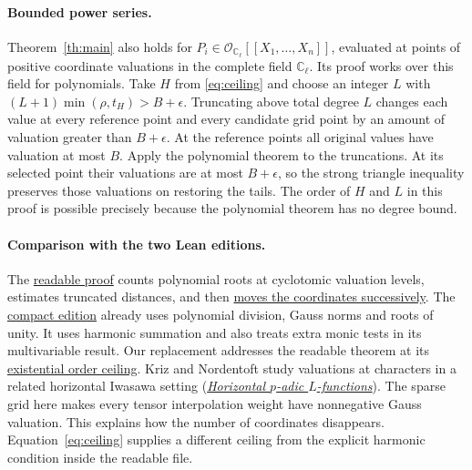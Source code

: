 \documentclass[11pt]{article}
\newcommand{\cO}{\mathcal O}\newcommand{\Tr}{\operatorname{tr}}
\newcommand{\src}[3]{\href{https://github.com/lsernau/grh-lean/blob/72fead102f663d5c7a407964a13dc0cf9d977207/grh/src/#1.lean\#L#2}{#3}}
\newcommand{\cmp}[3]{\href{https://github.com/lsernau/grh-lean/blob/72fead102f663d5c7a407964a13dc0cf9d977207/grh-compact/src/#1.lean\#L#2}{#3}}
\newcommand{\rootsrc}[2]{\src{New/Congruences/Selmer/RootsOfUnity}{#1}{#2}}
\begin{document}
\paragraph{Bounded power series.} Theorem~\ref{th:main} also holds for $P_i\in\cO_{\mathbb C_\ell}[[X_1,\ldots,X_n]]$, evaluated at points of positive coordinate valuations in the complete field $\mathbb C_\ell$. Its proof works over this field for polynomials. Take $H$ from \eqref{eq:ceiling} and choose an integer $L$ with $(L+1)\min(\rho,t_H)>B+\epsilon$. Truncating above total degree $L$ changes each value at every reference point and every candidate grid point by an amount of valuation greater than $B+\epsilon$. At the reference points all original values have valuation at most $B$. Apply the polynomial theorem to the truncations. At its selected point their valuations are at most $B+\epsilon$, so the strong triangle inequality preserves those valuations on restoring the tails. The order of $H$ and $L$ in this proof is possible precisely because the polynomial theorem has no degree bound.

\paragraph{Comparison with the two Lean editions.} The \rootsrc{300}{readable proof} counts polynomial roots at cyclotomic valuation levels, estimates truncated distances, and then \rootsrc{427}{moves the coordinates successively}. The \cmp{New/Selmer/RootsOfUnityPoints}{21}{compact edition} already uses polynomial division, Gauss norms and roots of unity. It uses harmonic summation and also treats extra monic tests in its multivariable result. Our replacement addresses the readable theorem at its \rootsrc{474}{existential order ceiling}. Kriz and Nordentoft study valuations at characters in a related horizontal Iwasawa setting (\href{https://arxiv.org/abs/2310.20678}{\emph{Horizontal $p$-adic $L$-functions}}). The sparse grid here makes every tensor interpolation weight have nonnegative Gauss valuation. This explains how the number of coordinates disappears. Equation~\eqref{eq:ceiling} supplies a different ceiling from the explicit harmonic condition inside the readable file.
\newpage
\end{document}
